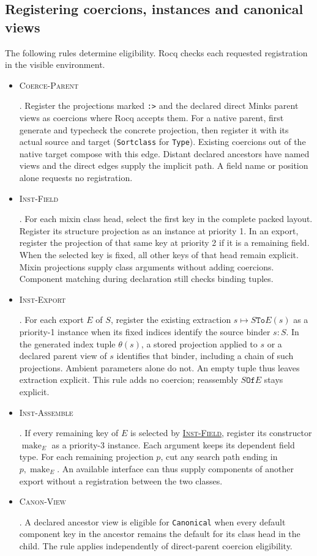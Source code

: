 \documentclass{article}
\newcommand{\ttt}[1]{\texttt{#1}}
\newcommand{\make}{\operatorname{make}}
\newcommand{\rdefn}[1]{\hypertarget{rule-#1}{\textsc{#1}}}
\newcommand{\ruse}[1]{\hyperlink{rule-#1}{\textsc{#1}}}
\begin{document}
\subsection{Registering coercions, instances and canonical views}

The following rules determine eligibility. Rocq checks each requested
registration in the visible environment.
\begin{itemize}
\item \rdefn{Coerce-Parent}. Register the projections marked \ttt{:>}
  and the declared direct Minks parent views as coercions where Rocq
  accepts them. For a native parent, first generate and typecheck the
  concrete projection, then register it with its actual source and target
  (\ttt{Sortclass} for \ttt{Type}). Existing coercions out of the
  native target compose with this edge. Distant declared ancestors have
  named views and the
  direct edges supply the implicit path. A field name or position alone
  requests no registration.

\item \rdefn{Inst-Field}. For each mixin class head, select the first
  key in the complete packed layout. Register its structure projection
  as an instance at priority 1. In an export, register the projection
  of that same key at priority 2 if it is a remaining field. When the
  selected key is fixed, all other keys of that head remain explicit.
  Mixin projections supply class arguments without adding coercions.
  Component matching during declaration still checks binding tuples.
\item \rdefn{Inst-Export}. For each export $E$ of $S$, register the
existing extraction $s\mapsto S\ttt{To}E(s)$ as a priority-1 instance
when its fixed indices identify the source binder $s:S$. In the
generated index tuple $\theta(s)$, a stored projection applied to $s$
or a declared parent view of $s$ identifies that binder, including a
chain of such projections. Ambient parameters alone do not. An empty
tuple thus leaves extraction explicit. This rule adds no coercion;
reassembly $S\ttt{Of}E$ stays explicit.
\item \rdefn{Inst-Assemble}. If every remaining key of $E$ is selected by
  \ruse{Inst-Field}, register its constructor $\make_E$ as a priority-3
  instance. Each argument keeps its dependent field type. For each
  remaining projection $p$, cut any search path ending in $p,\make_E$.
  An available interface can thus supply components of another export
  without a registration between the two classes.
\item \rdefn{Canon-View}. A declared ancestor view is eligible for \ttt{Canonical} when every
  default component key in the ancestor remains the default for its
  class head in the child. The rule applies independently of
  direct-parent coercion eligibility.
\end{itemize}
\end{document}
